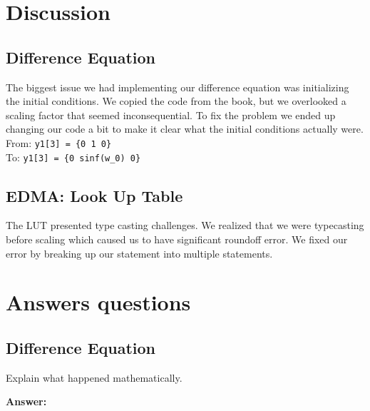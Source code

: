 \documentclass{article}
\begin{document}
\section{Discussion}

\subsection{Difference Equation}

The biggest issue we had implementing our difference equation was initializing the initial conditions.
We copied the code from the book, but we overlooked a scaling factor that seemed inconsequential.
To fix the problem we ended up changing our code a bit to make it clear what the initial conditions actually were. \\

From: \verb|y1[3] = {0 1 0}| \\
To: \verb|y1[3] = {0 sinf(w_0) 0}|

\subsection{EDMA: Look Up Table}

The LUT presented type casting challenges.
We realized that we were typecasting before scaling which caused us to have significant roundoff error.
We fixed our error by breaking up our statement into multiple statements.


\section{Answers questions}

\subsection{Difference Equation}

\begin{enumerate}
  \begin{item}
    Explain what happened mathematically.

  \textbf{Answer:}

  \end{item}
\end{enumerate}
\end{document}
